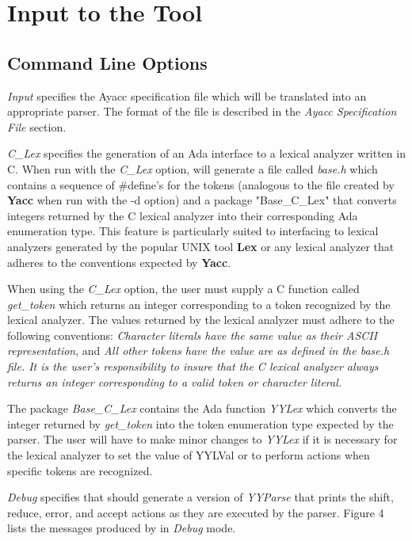 \section{Input to the Tool}
\subsection{Command Line Options}
{\it Input} specifies the Ayacc specification file which will be translated
into an appropriate parser.  The format of the file is described in the
{\it Ayacc Specification File} section.

{\it C\_Lex} specifies the generation of an Ada interface 
to a lexical analyzer written in C.  When run
with the {\it C\_Lex} option, \ayacc will generate a file called
{\it base.h}
which contains a sequence of \#define's for the tokens
(analogous to the file created by {\bf Yacc} when run with the -d option)
and a package "Base\_C\_Lex" that converts integers returned by the C lexical
analyzer into their corresponding Ada enumeration type.  This feature
is particularly suited to interfacing to
lexical analyzers generated
by the popular UNIX tool {\bf Lex} or any lexical analyzer that adheres
to the conventions expected by {\bf Yacc}.

When using the {\it C\_Lex} option, the user must supply a C function called
{ \it get\_token}
which returns an integer corresponding to a token recognized by the
lexical analyzer.  The values returned by the lexical analyzer must
adhere to the following conventions: {\it Character literals have the
same value as their ASCII representation}, and {\it All other tokens
have the value are as defined in the
{\it base.h}
file.  It is the user's responsibility to insure that the C lexical analyzer
always returns an integer corresponding to a valid token or
character literal.}

The package
{\it Base\_C\_Lex}
contains the Ada function
{\it YYLex}
which converts the integer returned by
{\it get\_token}
into the token enumeration type  expected by the parser.  The user will
have to make minor changes to
{\it YYLex}
if it is necessary for the lexical analyzer to set the value of YYLVal or
to perform actions when specific tokens are recognized.

{\it Debug} specifies that \ayacc should generate a version of
{\it YYParse}
that prints the shift, reduce, error, and accept actions as they are
executed by the parser.  Figure 4 lists the messages produced by \ayacc in
{\it Debug} mode.

